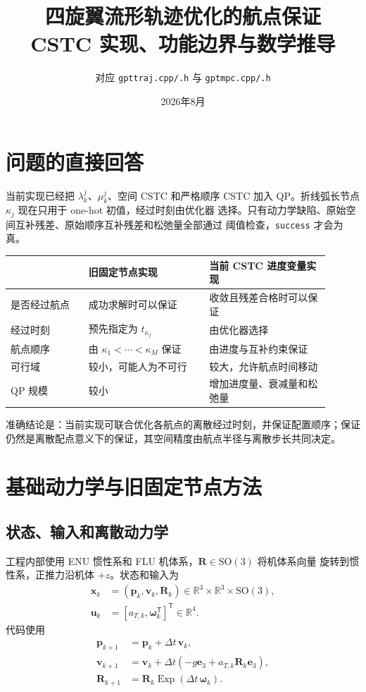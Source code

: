 \documentclass[UTF8,a4paper,11pt]{ctexart}
\title{四旋翼流形轨迹优化的航点保证\\CSTC 实现、功能边界与数学推导}
\author{对应 \texttt{gpttraj.cpp/.h} 与 \texttt{gptmpc.cpp/.h}}
\date{2026年8月}
\newcommand{\SOthree}{\mathrm{SO}(3)}
\newcommand{\ExpSO}{\operatorname{Exp}}
\begin{document}
\maketitle
\tableofcontents

\section{问题的直接回答}

当前实现已经把 $\lambda_k^j$、$\mu_k^j$、空间 CSTC 和严格顺序 CSTC
加入 QP。折线弧长节点 $\kappa_j$ 现在只用于 one-hot 初值，经过时刻由优化器
选择。只有动力学缺陷、原始空间互补残差、原始顺序互补残差和松弛量全部通过
阈值检查，\texttt{success} 才会为真。

\begin{center}
\begin{tabular}{p{0.22\linewidth}p{0.34\linewidth}p{0.34\linewidth}}
\toprule
 & 旧固定节点实现 & 当前 CSTC 进度变量实现\\
\midrule
是否经过航点 & 成功求解时可以保证 & 收敛且残差合格时可以保证\\
经过时刻 & 预先指定为 $t_{\kappa_j}$ & 由优化器选择\\
航点顺序 & 由 $\kappa_1<\cdots<\kappa_M$ 保证 & 由进度与互补约束保证\\
可行域 & 较小，可能人为不可行 & 较大，允许航点时间移动\\
QP 规模 & 较小 & 增加进度量、衰减量和松弛量\\
\bottomrule
\end{tabular}
\end{center}

准确结论是：当前实现可联合优化各航点的离散经过时刻，并保证配置顺序；保证
仍然是离散配点意义下的保证，其空间精度由航点半径与离散步长共同决定。

\section{基础动力学与旧固定节点方法}

\subsection{状态、输入和离散动力学}

工程内部使用 ENU 惯性系和 FLU 机体系，$\bm R\in\SOthree$ 将机体系向量
旋转到惯性系，正推力沿机体 $+z$。状态和输入为
\begin{align}
 \bm x_k&=(\bm p_k,\bm v_k,\bm R_k)
 \in\mathbb R^3\times\mathbb R^3\times\SOthree,\\
 \bm u_k&=[a_{T,k},\bm\omega_k^\mathsf T]^\mathsf T\in\mathbb R^4.
\end{align}
代码使用
\begin{align}
 \bm p_{k+1}&=\bm p_k+\Delta t\,\bm v_k,\\
 \bm v_{k+1}&=\bm v_k+\Delta t(-g\bm e_3+a_{T,k}\bm R_k\bm e_3),\\
 \bm R_{k+1}&=\bm R_k\ExpSO(\Delta t\,\bm\omega_k).
 \label{eq:dynamics}
\end{align}
\end{document}
